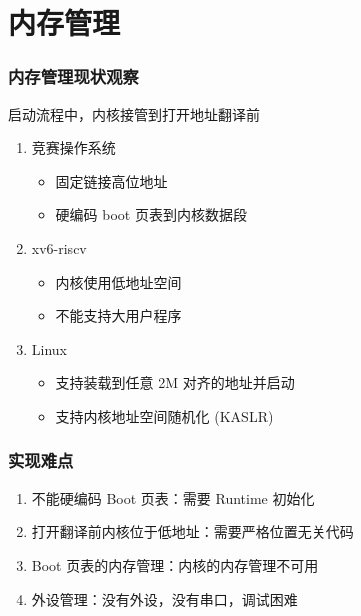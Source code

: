 \section{内存管理}

\begin{frame}
    \frametitle{内存管理现状观察}

    启动流程中，内核接管到打开地址翻译前

    \begin{enumerate}
        \item 竞赛操作系统
              \begin{itemize}
                  \item 固定链接高位地址
                  \item 硬编码 boot 页表到内核数据段
              \end{itemize}
        \item xv6-riscv
              \begin{itemize}
                  \item 内核使用低地址空间
                  \item 不能支持大用户程序
              \end{itemize}
        \item Linux
              \begin{itemize}
                  \item 支持装载到任意 2M 对齐的地址并启动
                  \item 支持内核地址空间随机化 (KASLR)
              \end{itemize}
    \end{enumerate}

\end{frame}

\begin{frame}
    \frametitle{实现难点}


    \begin{enumerate}
        \item 不能硬编码 Boot 页表：需要 Runtime 初始化
        \item 打开翻译前内核位于低地址：需要严格位置无关代码
        \item Boot 页表的内存管理：内核的内存管理不可用
        \item 外设管理：没有外设，没有串口，调试困难
    \end{enumerate}

\end{frame}

